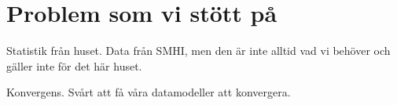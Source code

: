 \section{Problem som vi stött på}

Statistik från huset. Data från SMHI, men den är inte alltid vad vi behöver och gäller inte för det här huset.

Konvergens. Svårt att få våra datamodeller att konvergera.